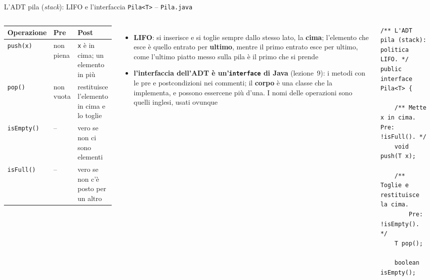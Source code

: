 \documentclass[10pt,aspectratio=169,xcolor={table}]{beamer}
\begin{document}
\begin{frame}[fragile]{L'ADT pila (\emph{stack}): LIFO e l'interfaccia \texttt{Pila<T>} -- \texttt{Pila.java}}
\begin{columns}[T]
\footnotesize
\begin{center}
\renewcommand{\arraystretch}{1.15}
\begin{tabular}{|l|l|>{\raggedright\arraybackslash}p{3.6cm}|}
\hline
\textbf{Operazione} & \textbf{Pre} & \textbf{Post} \\
\hline
\texttt{push(x)} & non piena & \texttt{x} è in cima; un elemento in più \\
\hline
\texttt{pop()} & non vuota & restituisce l'elemento in cima e lo toglie \\
\hline
\texttt{isEmpty()} & -- & vero se non ci sono elementi \\
\hline
\texttt{isFull()} & -- & vero se non c'è posto per un altro \\
\hline
\end{tabular}
\end{center}
\begin{itemize}\itemsep=3pt
    \item \textbf{LIFO}: si inserisce e si toglie sempre dallo stesso lato, la \textbf{cima}; l'elemento che esce è quello entrato per \textbf{ultimo}, mentre il primo entrato esce per ultimo, come l'ultimo piatto messo sulla pila è il primo che si prende
    \item \textbf{l'interfaccia dell'ADT è un'\texttt{interface} di Java} (lezione~9): i metodi con le pre e postcondizioni nei commenti; il \textbf{corpo} è una classe che la implementa, e possono essercene più d'una. I nomi delle operazioni sono quelli inglesi, usati ovunque
\end{itemize}

\begin{lstlisting}[basicstyle=\ttfamily\scriptsize]
/** L'ADT pila (stack): politica LIFO. */
public interface Pila<T> {

    /** Mette x in cima. Pre: !isFull(). */
    void push(T x);

    /** Toglie e restituisce la cima.
        Pre: !isEmpty(). */
    T pop();

    boolean isEmpty();


\end{lstlisting}
\end{columns}
\end{frame}
\end{document}
